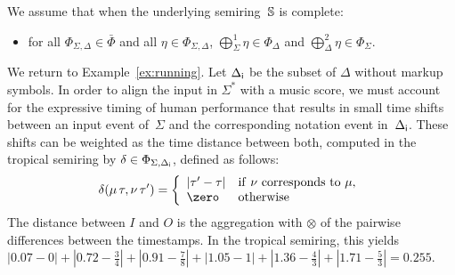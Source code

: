 %

\noindent
We assume that when the underlying semiring~$\mathbb{S}$ is complete:
\begin{itemize}
\item 
	  for all $\Phi_{\Sigma, \Delta} \in \bar\Phi$
	  and all $\eta \in \Phi_{\Sigma, \Delta}$,
	  $\bigoplus^1_\Sigma \eta \in \Phi_{\Delta}$ and
	  $\bigoplus^2_\Delta \eta \in \Phi_{\Sigma}$.
\end{itemize}


\begin{example}\label{distance-time}
We return to Example~\ref{ex:running}.
Let ${\Delta_\mathsf{i}}$ be the subset of $\Delta$ without markup symbols.
In order to align the input in $\Sigma^*$ %
with a music score, %
we must account for
the expressive timing of human performance that
results in small time shifts between an input event of~$\Sigma$ and the corresponding
notation event in~${\Delta_\mathsf{i}}$.
These shifts can be weighted as the time distance between both,
computed in the tropical semiring by $\delta \in \Phi_{\Sigma, {\Delta_\mathsf{i}}}$,
defined as follows:
\[
\delta(\mu\ts{\tau}, \nu\ts{\tau'}) =
\left\{
\begin{array}{ll}
   | \tau' - \tau | & \mathrm{if}\  \nu \rm{\ corresponds\ to\ } \mu,\\
   \zero  & \mathrm{otherwise}
\end{array}
\right.
\]
The distance between $I$ and $O$ is the  aggregation with $\otimes$
of the pairwise differences between the
timestamps. In the tropical semiring, this yields
$|0.07 - 0| + |0.72 - \frac{3}{4}| + |0.91- \frac{7}{8} | +
|1.05-1| + |1.36-\frac{4}{3}| + |1.71-\frac{5}{3}|= 0.255$.
\endex
\end{example}


